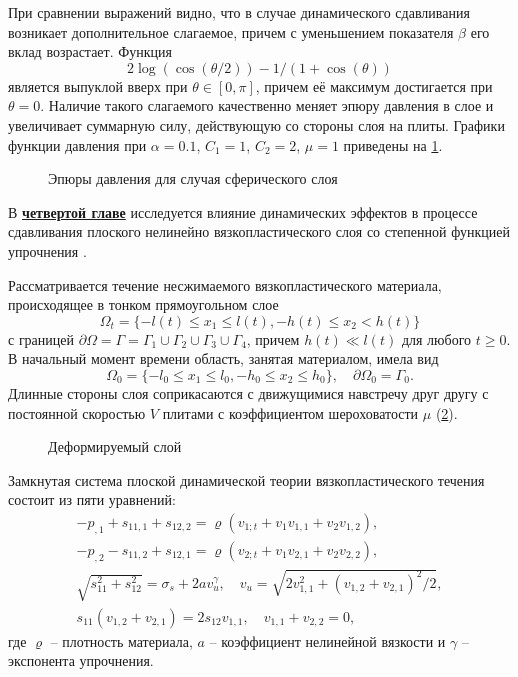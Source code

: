 При сравнении выражений видно, что в случае динамического сдавливания возникает дополнительное слагаемое, причем с уменьшением показателя $\beta$ его вклад возрастает. Функция
\begin{equation*}
  2\log{\left(\cos{\left({\theta / 2}\right)}\right)} - 1/\left(1+\cos{\left(\theta\right)}\right)
\end{equation*}
является выпуклой вверх при $\theta \in [0, \pi]$, причем её максимум достигается при $\theta=0$.
Наличие такого слагаемого качественно меняет эпюру давления в слое и увеличивает суммарную силу, действующую со стороны слоя на плиты.
Графики функции давления при $\alpha=0.1$, $C_1=1$, $C_2=2$, $\mu=1$ приведены на \cref{fig:ch3/sec3/pressure}.
\begin{figure}[ht]
  \caption{Эпюры давления для случая сферического слоя}
  \label{fig:ch3/sec3/pressure}
\end{figure}

В \underline{\textbf{четвертой главе}} исследуется влияние динамических эффектов в процессе сдавливания плоского нелинейно вязкопластического слоя со степенной функцией упрочнения \autocite{Shabaykin:2021b}.

Рассматривается течение несжимаемого вязкопластического материала, происходящее в тонком прямоугольном слое
\begin{equation}
  \Omega_{t} = \{-l(t) \le x_{1} \le l(t), -h(t) \le x_{2} < h(t)\}
\end{equation}
с границей $\partial\Omega = \Gamma = \Gamma_{1} \cup \Gamma_{2} \cup \Gamma_{3} \cup \Gamma_{4}$, причем $h(t) \ll l(t)$ для любого $t \ge 0$.
В начальный момент времени область, занятая материалом, имела вид
\begin{equation}
  \Omega_{0} = \{-l_{0} \le x_{1} \le l_{0}, -h_{0} \le x_{2} \le h_{0}\}, \quad \partial\Omega_{0} = \Gamma_{0}.
\end{equation}
Длинные стороны слоя соприкасаются с движущимися навстречу друг другу с постоянной скоростью $V$ плитами с коэффициентом шероховатости $\mu$ (\cref{fig:ch4/layer}).
\begin{figure}[ht]
  \caption{Деформируемый слой}
  \label{fig:ch4/layer}
\end{figure}

Замкнутая система плоской динамической теории вязкопластического течения состоит из пяти уравнений:
\begin{gather}
  -p_{,1}+s_{11,1}+s_{12,2} = \varrho \left(v_{1;t}+v_{1} v_{1,1} + v_{2} v_{1,2} \right),
  \\
  -p_{,2}-s_{11,2}+s_{12,1} = \varrho \left(v_{2;t}+v_{1} v_{2,1} + v_{2} v_{2,2} \right),
  \\
  \sqrt{s^2_{11}+s^2_{12}}=\sigma_{s} + 2 a v_{u}^\gamma, \quad v_{u} = \sqrt{2 v^2_{1,1}+\left(v_{1,2}+v_{2,1}\right)^2 / 2},
  \\
  s_{11} \left(v_{1,2}+v_{2,1}\right) = 2 s_{12} v_{1,1},\quad v_{1,1}+v_{2,2} = 0,
\end{gather}
где $\varrho$ -- плотность материала, $a$ -- коэффициент нелинейной вязкости и $\gamma$ -- экспонента упрочнения.

